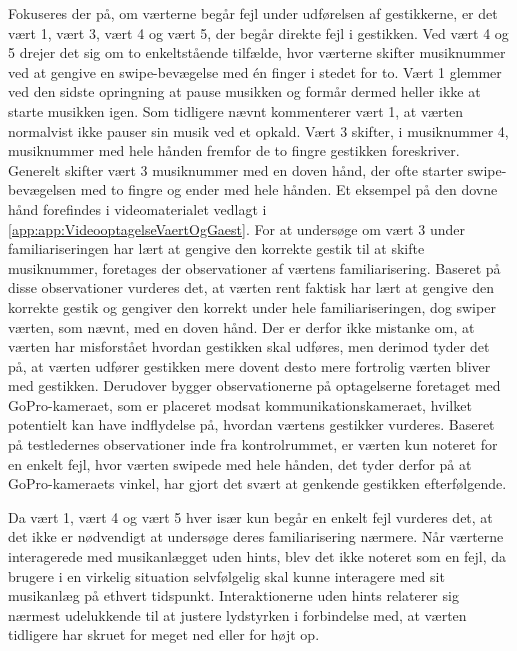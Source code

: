 Fokuseres der på, om værterne begår fejl under udførelsen af gestikkerne, er det vært 1, vært 3, vært 4 og vært 5, der begår direkte fejl i gestikken. Ved vært 4 og 5 drejer det sig om to enkeltstående tilfælde, hvor værterne skifter musiknummer ved at gengive en swipe-bevægelse med én finger i stedet for to. Vært 1 glemmer ved den sidste opringning at pause musikken og formår dermed heller ikke at starte musikken igen. Som tidligere nævnt kommenterer vært 1, at værten normalvist ikke pauser sin musik ved et opkald. Vært 3 skifter, i musiknummer 4, musiknummer med hele hånden fremfor de to fingre gestikken foreskriver. Generelt skifter vært 3 musiknummer med en doven hånd, der ofte starter swipe-bevægelsen med to fingre og ender med hele hånden. Et eksempel på den dovne hånd forefindes i videomaterialet vedlagt i \autoref{app:app:VideooptagelseVaertOgGaest}. For at undersøge om vært 3 under familiariseringen har lært at gengive den korrekte gestik til at skifte musiknummer, foretages der observationer af værtens familiarisering. Baseret på disse observationer vurderes det, at værten rent faktisk har lært at gengive den korrekte gestik og gengiver den korrekt under hele familiariseringen, dog swiper værten, som nævnt, med en doven hånd. Der er derfor ikke mistanke om, at værten har misforstået hvordan gestikken skal udføres, men derimod tyder det på, at værten udfører gestikken mere dovent desto mere fortrolig værten bliver med gestikken. Derudover bygger observationerne på optagelserne foretaget med GoPro-kameraet, som er placeret modsat kommunikationskameraet, hvilket potentielt kan have indflydelse på, hvordan værtens gestikker vurderes. Baseret på testledernes observationer inde fra kontrolrummet, er værten kun noteret for en enkelt fejl, hvor værten swipede med hele hånden, det tyder derfor på at GoPro-kameraets vinkel, har gjort det svært at genkende gestikken efterfølgende. 

Da vært 1, vært 4 og vært 5 hver især kun begår en enkelt fejl vurderes det, at det ikke er nødvendigt at undersøge deres familiarisering nærmere.\blankline
%
Når værterne interagerede med musikanlægget uden hints, blev det ikke noteret som en fejl, da brugere i en virkelig situation selvfølgelig skal kunne interagere med sit musikanlæg på ethvert tidspunkt. Interaktionerne uden hints relaterer sig nærmest udelukkende til at justere lydstyrken i forbindelse med, at værten tidligere har skruet for meget ned eller for højt op. 

